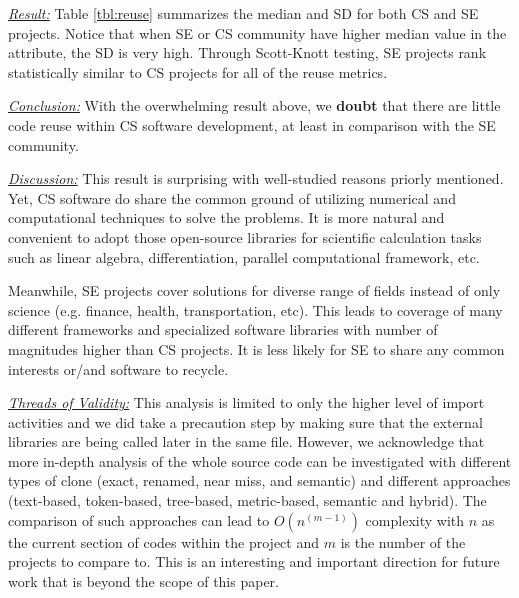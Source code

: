 \documentclass[sigconf,review,anonymous]{acmart}
\newenvironment{RQ}{\vspace{1mm}\begin{tcolorbox}[enhanced,width=3.4in,size=fbox,colback=red!5!white,drop shadow southwest,sharp corners]}{\end{tcolorbox}}
\begin{document}
\noindent \textit{\underline{Result:}} Table \ref{tbl:reuse} summarizes the median and SD for both CS and SE projects. Notice that when SE or CS community have higher median value in the attribute, the SD is very high. Through Scott-Knott testing, SE projects rank statistically similar to CS projects for all of the reuse metrics. 

\begin{RQ} 
\textit{\underline{Conclusion:}} With the overwhelming result above, we \textbf{doubt} that there are little code reuse within CS software development, at least in comparison with the SE community. 
\end{RQ}

\noindent \textit{\underline{Discussion:}} This result is surprising with well-studied reasons priorly mentioned. Yet, CS software do share the common ground of utilizing numerical and computational techniques to solve the problems. It is more natural and convenient to adopt those open-source libraries for scientific calculation tasks such as linear algebra, differentiation, parallel computational framework, etc. 

Meanwhile, SE projects cover solutions for diverse range of fields instead of only science (e.g. finance, health, transportation, etc). This leads to coverage of many different frameworks and specialized software libraries with number of magnitudes higher than CS projects. It is less likely for SE to share any common interests or/and software to recycle. 

\noindent \textit{\underline{Threads of Validity:}} This analysis is limited to only the higher level of import activities and we did take a precaution step by making sure that the external libraries are being called later in the same file. However, we acknowledge that more in-depth analysis of the whole source code can be investigated with different types of clone (exact, renamed, near miss, and semantic) and different approaches (text-based, token-based, tree-based, metric-based, semantic and hybrid). The comparison of such approaches can lead to $O(n^{(m-1)})$ complexity with $n$ as the current section of codes within the project and $m$ is the number of the projects to compare to. This is an interesting and important direction for future work that is beyond the scope of this paper.  






\end{document}
